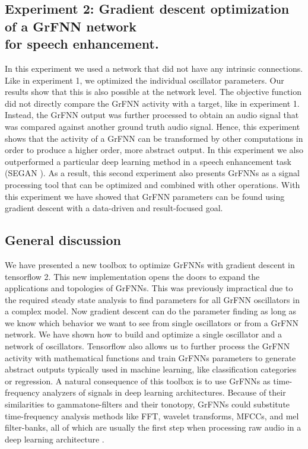\documentclass{report}
\begin{document}
\subsection{Experiment 2: Gradient descent optimization of a GrFNN network \\ for speech enhancement.} 

In this experiment we used a network that did not have any intrinsic connections. Like in experiment 1, we optimized the individual oscillator parameters. Our results show that this is also possible at the network level. The objective function did not directly compare the GrFNN activity with a target, like in experiment 1. Instead, the GrFNN output was further processed to obtain an audio signal that was compared against another ground truth audio signal. Hence, this experiment shows that the activity of a GrFNN can be transformed by other computations in order to produce a higher order, more abstract output. In this experiment we also outperformed a particular deep learning method in a speech enhancement task (SEGAN \cite{pascual2017segan}). As a result, this second experiment also presents GrFNNs as a signal processing tool that can be optimized and combined with other operations. With this experiment we have showed that GrFNN parameters can be found using gradient descent with a data-driven and result-focused goal.

\subsection{General discussion}

We have presented a new toolbox to optimize GrFNNs with gradient descent in tensorflow 2. This new implementation opens the doors to expand the applications and topologies of GrFNNs. This was previously impractical due to the required steady state analysis to find parameters for all GrFNN oscillators in a complex model. Now gradient descent can do the parameter finding as long as we know which behavior we want to see from single oscillators or from a GrFNN network. We have shown how to build and optimize a single oscillator and a network of oscillators. Tensorflow also allows us to further process the GrFNN activity with mathematical functions and train GrFNNs parameters to generate abstract outputs typically used in machine learning, like classification categories or regression. A natural consequence of this toolbox is to use GrFNNs as time-frequency analyzers of signals in deep learning architectures. Because of their similarities to gammatone-filters and their tonotopy, GrFNNs could substitute time-frequency analysis methods like FFT, wavelet transforms, MFCCs, and mel filter-banks, all of which are usually the first step when processing raw audio in a deep learning architecture \cite{purwins2019deep}. 
\end{document}
